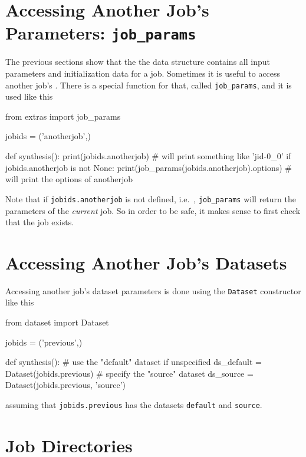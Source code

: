 \stoptabletwo



\section{Accessing Another Job's Parameters:  \texttt{job\_params}}

The previous sections show that the the \params data structure
contains all input parameters and initialization data for a job.
Sometimes it is useful to access another job's \params.  There is a
special function for that, called \texttt{job\_params}, and it is used
like this
\begin{python}
from extras import job_params

jobids = ('anotherjob',)

def synthesis():
    print(jobids.anotherjob)
    # will print something like 'jid-0_0'
    if jobids.anotherjob is not None:
        print(job_params(jobids.anotherjob).options)
        # will print the options of anotherjob
\end{python}
Note that if \texttt{jobids.anotherjob} is not defined, i.e.\ \pyNone,
\texttt{job\_params} will return the parameters of the
\textsl{current} job.  So in order to be safe, it makes sense to first
check that the job exists.



\section{Accessing Another Job's Datasets}
Accessing another job's dataset parameters is done using the
\texttt{Dataset} constructor like this
\begin{python}
from dataset import Dataset

jobids = ('previous',)

def synthesis():
    # use the "default" dataset if unspecified
    ds_default = Dataset(jobids.previous)
    # specify the "source" dataset
    ds_source = Dataset(jobids.previous, 'source')
\end{python}
assuming that \texttt{jobids.previous} has the datasets
\texttt{default} and \texttt{source}.




\section{Job Directories}
\label{sec:job_directories}

